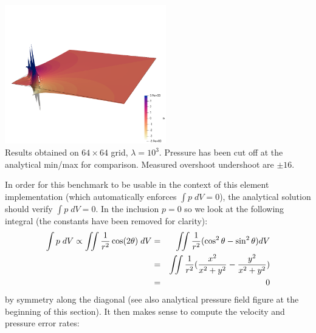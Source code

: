 \begin{center}
\includegraphics[width=7cm]{python_codes/fieldstone_161/results/bench4/press2}\\
{\captionfont Results obtained on $64\times 64$ grid, $\lambda=10^3$. 
Pressure has been cut off at the analytical min/max for comparison. 
Measured overshoot undershoot are $\pm16$.}
\end{center}

In order for this benchmark to be usable in the context of this element implementation (which 
automatically enforces $\int p \; dV=0$), 
the analytical solution should verify $\int p\; dV=0$. 
In the inclusion $p=0$ so we look at the following integral (the constants have been 
removed for clarity):
\begin{eqnarray}
\int p \; dV \propto \iint \frac{1}{r^2} \cos(2\theta) \; dV 
&=& \iint \frac{1}{r^2} ( \cos^2\theta - \sin^2 \theta) dV \nonumber\\
&=& \iint \frac{1}{r^2} ( \frac{x^2}{x^2+y^2} - \frac{y^2}{x^2+y^2}) \nonumber\\
&=& 0
\end{eqnarray}
by symmetry along the diagonal (see also analytical pressure field figure at the 
beginning of this section).
It then makes sense to compute the velocity and pressure error rates:


